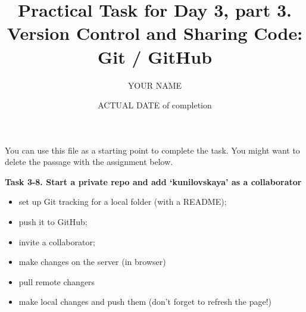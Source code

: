 \documentclass[a4paper,11pt]{article}
\title{Practical Task for Day 3, part 3. \\Version Control and Sharing Code: Git / GitHub}
\author{YOUR NAME}
\date{ACTUAL DATE of completion}
\begin{document}
	
	\maketitle

\bigskip

You can use this file as a starting point to complete the task. You might want to delete the passage with the assignment below.

\bigskip

\textbf{Task 3-8. Start a private repo and add `kunilovskaya' as a collaborator}

\begin{itemize}
	\item set up Git tracking for a local folder (with a README);
	\item push it to GitHub;  
	\item invite a collaborator;
	\item make changes on the server (in browser)
	\item pull remote changers
	\item make local changes and push them (don't forget to refresh the page!)
\end{itemize}
	
\end{document}
